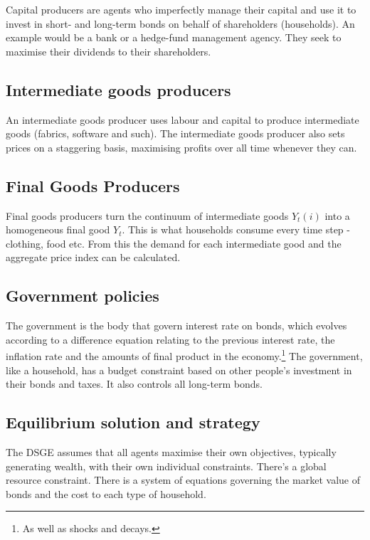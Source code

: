 \documentclass[notitlepage,12pt]{report}
\begin{document}
Capital producers are agents who imperfectly manage their capital and use it to invest in short- and long-term bonds on behalf of shareholders (households). An example would be a bank or a hedge-fund management agency. They seek to maximise their dividends to their shareholders.

\subsection{Intermediate goods producers}

An intermediate goods producer uses labour and capital to produce intermediate goods (fabrics, software and such). The intermediate goods producer also sets prices on a staggering basis, maximising profits over all time whenever they can.

\subsection{Final Goods Producers}

Final goods producers turn the continuum of intermediate goods $Y_t(i)$ into a homogeneous final good $Y_t$. This is what households consume every time step - clothing, food etc. From this the demand for each intermediate good and the aggregate price index can be calculated.

\subsection{Government policies}

The government is the body that govern interest rate on bonds, which evolves according to a difference equation relating to the previous interest rate, the inflation rate and the amounts of final product in the economy.\footnote{As well as shocks and decays.} The government, like a household, has a budget constraint based on other people's investment in their bonds and taxes. It also controls all long-term bonds.

\subsection{Equilibrium solution and strategy}

The DSGE assumes that all agents maximise their own objectives, typically generating wealth, with their own individual constraints. There's a global resource constraint. There is a system of equations governing the market value of bonds and the cost to each type of household.
\end{document}
